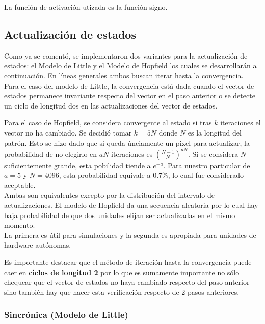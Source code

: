 \documentclass[%
    final,
    reprint,
    notitlepage,
    narroweqnarray,
    inline,
    twoside,
    invited
    ]{ieee}
\begin{document}
\par La función de activación utizada es la función signo.

\subsection{Actualización de estados}

\par Como ya se comentó, se implementaron dos variantes para la actualización de estados: el Modelo de Little y el Modelo de Hopfield los cuales se desarrollarán a continuación. En líneas generales ambos buscan iterar hasta la convergencia. \\
Para el caso del modelo de Little, la convergencia está dada cuando el vector de estados permanece invariante respecto del vector en el paso anterior o se detecte un ciclo de longitud dos en las actualizaciones del vector de estados.\\

\par Para el caso de Hopfield, se considera convergente al estado si tras $k$ iteraciones el vector no ha cambiado. Se decidió tomar 
$k = 5N$ donde $N$ es la longitud del patrón. Esto se hizo dado que si queda únciamente un pixel para actualizar, 
la probabilidad de no elegirlo en $aN$ iteraciones es $\left(\frac{N-1}{N}\right)^{aN}$. Si se considera $N$ suficientemente grande, 
esta pobilidad tiende a $e^{-a}$. Para nuestro particular de $a=5$ y $N=4096$, esta probabilidad equivale a $0.7\%$, lo 
cual fue considerado aceptable.\\

Ambas son equivalentes excepto por la distribución del intervalo de actualizaciones. El modelo de Hopfield da una secuencia aleatoria por lo cual hay baja probabilidad de que dos unidades elijan ser actualizadas en el mismo momento.\\
La primera es útil para simulaciones y la segunda es apropiada para unidades de hardware autónomas.\\
\par Es importante destacar que el método de iteración hasta la convergencia puede caer en \textbf{ciclos de longitud 2} por lo que es sumamente importante no sólo chequear que el vector de estados no haya cambiado respecto del paso anterior sino también hay que hacer esta verificación respecto de 2 pasos anteriores.

\subsubsection{Sincrónica (Modelo de Little)}
\end{document}
